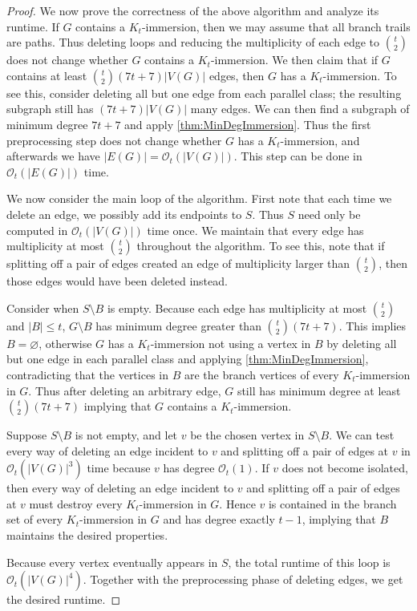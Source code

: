 \documentclass{article}
\theoremstyle{definition}
\begin{document}
\begin{proof}
    We now prove the correctness of the above algorithm and analyze its runtime. If $G$ contains a $K_t$-immersion, then we may assume that all branch trails are paths. Thus deleting loops and reducing the multiplicity of each edge to $\binom{t}{2}$ does not change whether $G$ contains a $K_t$-immersion. We then claim that if $G$ contains at least $\binom{t}{2}(7t+7)|V(G)|$ edges, then $G$ has a $K_t$-immersion. To see this, consider deleting all but one edge from each parallel class; the resulting subgraph still has $(7t+7)|V(G)|$ many edges. We can then find a subgraph of minimum degree $7t+7$ and apply \cref{thm:MinDegImmersion}. Thus the first preprocessing step does not change whether $G$ has a $K_t$-immersion, and afterwards we have $|E(G)| = \mathcal{O}_t(|V(G)|)$. This step can be done in $\mathcal{O}_t(|E(G)|)$ time.

    We now consider the main loop of the algorithm. First note that each time we delete an edge, we possibly add its endpoints to $S$. Thus $S$ need only be computed in $\mathcal{O}_t(|V(G)|)$ time once. We maintain that every edge has multiplicity at most $\binom{t}{2}$ throughout the algorithm. To see this, note that if splitting off a pair of edges created an edge of multiplicity larger than $\binom{t}{2}$, then those edges would have been deleted instead.
    
    Consider when $S \setminus B$ is empty. Because each edge has multiplicity at most $\binom{t}{2}$ and $|B| \leq t$, $G\setminus B$ has minimum degree greater than $\binom{t}{2}(7t+7)$. This implies $B = \varnothing$, otherwise $G$ has a $K_t$-immersion not using a vertex in $B$ by deleting all but one edge in each parallel class and applying \cref{thm:MinDegImmersion}, contradicting that the vertices in $B$ are the branch vertices of every $K_t$-immersion in $G$. Thus after deleting an arbitrary edge, $G$ still has minimum degree at least $\binom{t}{2}(7t+7)$ implying that $G$ contains a $K_t$-immersion.

    Suppose $S \setminus B$ is not empty, and let $v$ be the chosen vertex in $S \setminus B$. We can test every way of deleting an edge incident to $v$ and splitting off a pair of edges at $v$ in $\mathcal{O}_t(|V(G)|^3)$ time because $v$ has degree $\mathcal{O}_t(1)$. If $v$ does not become isolated, then every way of deleting an edge incident to $v$ and splitting off a pair of edges at $v$ must destroy every $K_t$-immersion in $G$. Hence $v$ is contained in the branch set of every $K_t$-immersion in $G$ and has degree exactly $t-1$, implying that $B$ maintains the desired properties.

    Because every vertex eventually appears in $S$, the total runtime of this loop is $\mathcal{O}_t(|V(G)|^4)$. Together with the preprocessing phase of deleting edges, we get the desired runtime.
\end{proof}
\end{document}
